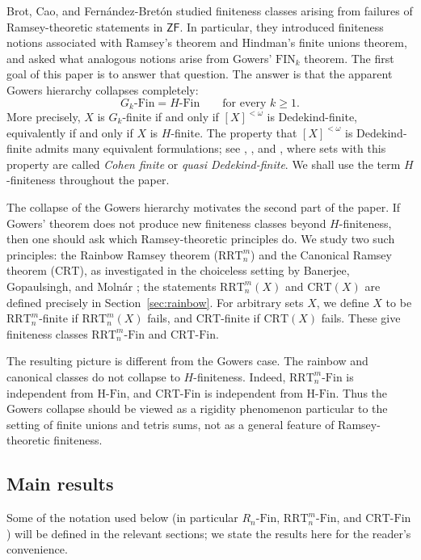 \documentclass[10pt,a4paper]{amsart}
\theoremstyle{definition}
\newcommand{\ZF}{\mathsf{ZF}}
\newcommand{\Fin}{\mathrm{Fin}}
\newcommand{\HFin}{\mathrm{H\text{-}Fin}}
\newcommand{\RnFin}[1]{R_{#1}\text{-}\mathrm{Fin}}
\newcommand{\FIN}{\mathrm{FIN}}
\newcommand{\RRT}{\mathrm{RRT}}
\newcommand{\CRT}{\mathrm{CRT}}
\newcommand{\RRTFin}[2]{\RRT^{#1}_{#2}\text{-}\mathrm{Fin}}
\newcommand{\CRTFin}{\CRT\text{-}\mathrm{Fin}}
\begin{document}
Brot, Cao, and Fern\'andez-Bret\'on \cite{BCF} studied finiteness classes arising from failures of Ramsey-theoretic statements in \(\ZF\).  In particular, they introduced finiteness notions associated with Ramsey's theorem and Hindman's finite unions theorem, and asked what analogous notions arise from Gowers' \(\FIN_k\) theorem.  The first goal of this paper is to answer that question.  The answer is that the apparent Gowers hierarchy collapses completely:
\[
    G_k\text{-}\Fin=H\text{-}\Fin
    \qquad\text{for every }k\geq 1.
\]
More precisely, \(X\) is \(G_k\)-finite if and only if \([X]^{<\omega}\) is Dedekind-finite, equivalently if and only if \(X\) is \(H\)-finite.  The property that \([X]^{<\omega}\) is Dedekind-finite admits many equivalent formulations; see \cite{BlackadarFarahKaragila}, \cite{KaragilaSchlicht}, and \cite{KeremedisWajch}, where sets with this property are called \emph{Cohen finite} or \emph{quasi Dedekind-finite}.  We shall use the term \(H\)-finiteness throughout the paper.

The collapse of the Gowers hierarchy motivates the second part of the paper.  If Gowers' theorem does not produce new finiteness classes beyond \(H\)-finiteness, then one should ask which Ramsey-theoretic principles do.  We study two such principles: the Rainbow Ramsey theorem (\(\RRT^m_n\)) and the Canonical Ramsey theorem (\(\CRT\)), as investigated in the choiceless setting by Banerjee, Gopaulsingh, and Moln\'ar \cite{BGM}; the statements \(\RRT^m_n(X)\) and \(\CRT(X)\) are defined precisely in Section~\ref{sec:rainbow}.  For arbitrary sets \(X\), we define \(X\) to be \(\RRT^m_n\)-finite if \(\RRT^m_n(X)\) fails, and \(\CRT\)-finite if \(\CRT(X)\) fails.  These give finiteness classes \(\RRTFin{m}{n}\) and \(\CRTFin\).

The resulting picture is different from the Gowers case.  The rainbow and canonical classes do not collapse to \(H\)-finiteness.  Indeed, \(\RRTFin{m}{n}\) is independent from \(\HFin\), and \(\CRTFin\) is independent from \(\HFin\).  Thus the Gowers collapse should be viewed as a rigidity phenomenon particular to the setting of finite unions and tetris sums, not as a general feature of Ramsey-theoretic finiteness.

\subsection*{Main results}

Some of the notation used below (in particular \(\RnFin{n}\), \(\RRTFin{m}{n}\), and \(\CRTFin\)) will be defined in the relevant sections; we state the results here for the reader's convenience.
\end{document}
